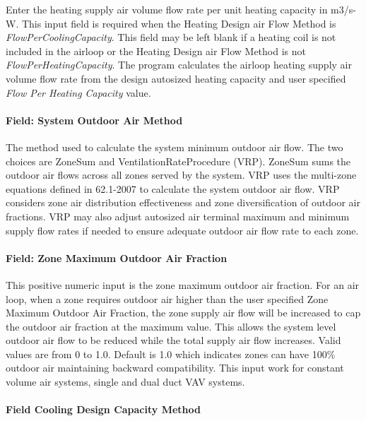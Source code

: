 Enter the heating supply air volume flow rate per unit heating capacity in m3/s-W. This input field is required when the Heating Design air Flow Method is \emph{FlowPerCoolingCapacity}. This field may be left blank if a heating coil is not included in the airloop or the Heating Design air Flow Method is not \emph{FlowPerHeatingCapacity}. The program calculates the airloop heating supply air volume flow rate from the design autosized heating capacity and user specified \emph{Flow Per Heating Capacity} value.

\paragraph{Field: System Outdoor Air Method}\label{field-system-outdoor-air-method-000}

The method used to calculate the system minimum outdoor air flow. The two choices are ZoneSum and VentilationRateProcedure (VRP). ZoneSum sums the outdoor air flows across all zones served by the system. VRP uses the multi-zone equations defined in 62.1-2007 to calculate the system outdoor air flow. VRP considers zone air distribution effectiveness and zone diversification of outdoor air fractions. VRP may also adjust autosized air terminal maximum and minimum supply flow rates if needed to ensure adequate outdoor air flow rate to each zone.

\paragraph{Field: Zone Maximum Outdoor Air Fraction}\label{field-zone-maximum-outdoor-air-fraction-000}

This positive numeric input is the zone maximum outdoor air fraction. For an air loop, when a zone requires outdoor air higher than the user specified Zone Maximum Outdoor Air Fraction, the zone supply air flow will be increased to cap the outdoor air fraction at the maximum value. This allows the system level outdoor air flow to be reduced while the total supply air flow increases. Valid values are from 0 to 1.0. Default is 1.0 which indicates zones can have 100\% outdoor air maintaining backward compatibility. This input work for constant volume air systems, single and dual duct VAV systems.

\paragraph{Field Cooling Design Capacity Method}\label{field-cooling-design-capacity-method-1}

